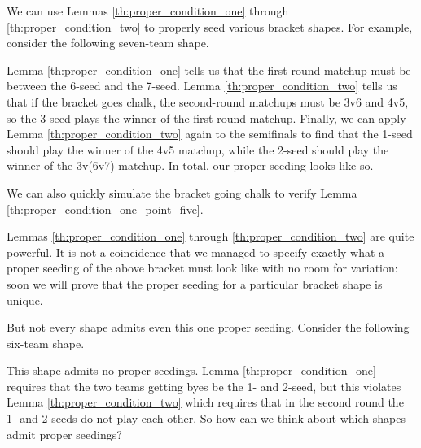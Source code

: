 {    

    We can use Lemmas \ref{th:proper_condition_one} through \ref{th:proper_condition_two} to properly seed various bracket shapes. For example, consider the following seven-team shape.


    Lemma \ref{th:proper_condition_one} tells us that the first-round matchup must be between the 6-seed and the 7-seed. Lemma \ref{th:proper_condition_two} tells us that if the bracket goes chalk, the second-round matchups must be 3v6 and 4v5, so the 3-seed plays the winner of the first-round matchup. Finally, we can apply Lemma \ref{th:proper_condition_two} again to the semifinals to find that the 1-seed should play the winner of the 4v5 matchup, while the 2-seed should play the winner of the 3v(6v7) matchup. In total, our proper seeding looks like so.


    We can also quickly simulate the bracket going chalk to verify Lemma \ref{th:proper_condition_one_point_five}.

    Lemmas \ref{th:proper_condition_one} through \ref{th:proper_condition_two} are quite powerful. It is not a coincidence that we managed to specify exactly what a proper seeding of the above bracket must look like with no room for variation: soon we will prove that the proper seeding for a particular bracket shape is unique. 

    But not every shape admits even this one proper seeding. Consider the following six-team shape.


    This shape admits no proper seedings. Lemma \ref{th:proper_condition_one} requires that the two teams getting byes be the 1- and 2-seed, but this violates Lemma \ref{th:proper_condition_two} which requires that in the second round the 1- and 2-seeds do not play each other. So how can we think about which shapes admit proper seedings?

}

